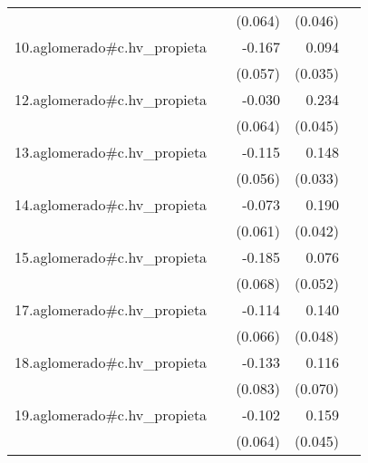 {\begin{longtable}{l*{4}{D{.}{.}{-1}}}
            &                     &     (0.064)         &     (0.046)         &                     \\
\addlinespace
10.aglomerado#c.hv\_propieta&                     &      -0.167\sym{**} &       0.094\sym{**} &                     \\
            &                     &     (0.057)         &     (0.035)         &                     \\
\addlinespace
12.aglomerado#c.hv\_propieta&                     &      -0.030         &       0.234\sym{***}&                     \\
            &                     &     (0.064)         &     (0.045)         &                     \\
\addlinespace
13.aglomerado#c.hv\_propieta&                     &      -0.115\sym{*}  &       0.148\sym{***}&                     \\
            &                     &     (0.056)         &     (0.033)         &                     \\
\addlinespace
14.aglomerado#c.hv\_propieta&                     &      -0.073         &       0.190\sym{***}&                     \\
            &                     &     (0.061)         &     (0.042)         &                     \\
\addlinespace
15.aglomerado#c.hv\_propieta&                     &      -0.185\sym{**} &       0.076         &                     \\
            &                     &     (0.068)         &     (0.052)         &                     \\
\addlinespace
17.aglomerado#c.hv\_propieta&                     &      -0.114         &       0.140\sym{**} &                     \\
            &                     &     (0.066)         &     (0.048)         &                     \\
\addlinespace
18.aglomerado#c.hv\_propieta&                     &      -0.133         &       0.116         &                     \\
            &                     &     (0.083)         &     (0.070)         &                     \\
\addlinespace
19.aglomerado#c.hv\_propieta&                     &      -0.102         &       0.159\sym{***}&                     \\
            &                     &     (0.064)         &     (0.045)         &                     \\

\end{longtable}}
